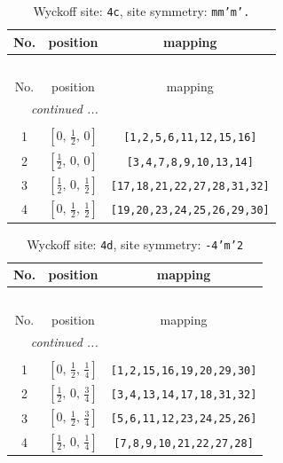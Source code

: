\documentclass[fleqn,8pt]{jsarticle}
\begin{document}
\renewcommand{\arraystretch}{1.2}
\begin{longtable}{ccc}
\caption{Wyckoff site: {\tt 4c}, site symmetry: {\tt mm'm'.}}
 \\
 \hline \hline
No. & position & mapping \\ \hline \endfirsthead

\multicolumn{2}{l}{\tablename\ \thetable{}} \\
 \hline \hline
No. & position & mapping \\ \hline \endhead

 \hline \hline
\multicolumn{2}{r}{\footnotesize\it continued ...} \\ \endfoot

 \hline \hline
\multicolumn{2}{r}{} \\ \endlastfoot

1 & $\left[ 0,\, \frac{1}{2},\, 0 \right]$ & {\tt [1,2,5,6,11,12,15,16]} \\ \hline
2 & $\left[ \frac{1}{2},\, 0,\, 0 \right]$ & {\tt [3,4,7,8,9,10,13,14]} \\ \hline
3 & $\left[ \frac{1}{2},\, 0,\, \frac{1}{2} \right]$ & {\tt [17,18,21,22,27,28,31,32]} \\ \hline
4 & $\left[ 0,\, \frac{1}{2},\, \frac{1}{2} \right]$ & {\tt [19,20,23,24,25,26,29,30]} \\
\end{longtable}
\renewcommand{\arraystretch}{1.2}
\begin{longtable}{ccc}
\caption{Wyckoff site: {\tt 4d}, site symmetry: {\tt -4'm'2}}
 \\
 \hline \hline
No. & position & mapping \\ \hline \endfirsthead

\multicolumn{2}{l}{\tablename\ \thetable{}} \\
 \hline \hline
No. & position & mapping \\ \hline \endhead

 \hline \hline
\multicolumn{2}{r}{\footnotesize\it continued ...} \\ \endfoot

 \hline \hline
\multicolumn{2}{r}{} \\ \endlastfoot

1 & $\left[ 0,\, \frac{1}{2},\, \frac{1}{4} \right]$ & {\tt [1,2,15,16,19,20,29,30]} \\ \hline
2 & $\left[ \frac{1}{2},\, 0,\, \frac{3}{4} \right]$ & {\tt [3,4,13,14,17,18,31,32]} \\ \hline
3 & $\left[ 0,\, \frac{1}{2},\, \frac{3}{4} \right]$ & {\tt [5,6,11,12,23,24,25,26]} \\ \hline
4 & $\left[ \frac{1}{2},\, 0,\, \frac{1}{4} \right]$ & {\tt [7,8,9,10,21,22,27,28]} \\
\end{longtable}
\end{document}
